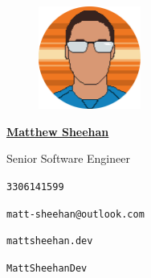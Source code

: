 \documentclass[12pt, oneside, final]{article}
\newlength{\logowidth}  \setlength{\logowidth}{0.75in}
\begin{document}
  \thispagestyle{empty}
  


    \begin{figure}
        \includegraphics[width = 0.3\textwidth]{figures/self-pixel-circle.png}
    \end{figure}


  \underline{\large\textsf{\textbf{Matthew Sheehan}}}

  \textmd{\small{Senior Software Engineer}}

  \vfill

  \vspace*{\fill}
  {\footnotesize{\faPhone}} \small{\texttt{330{\textendash}614{\textendash}1599}}

  \vspace*{\fill}
  {\footnotesize{\faEnvelope}} \small{\texttt{matt-sheehan@outlook.com}}

  \vspace*{\fill}
  {\footnotesize{\faGlobe}} \small{\texttt{mattsheehan.dev}}

  \vspace*{\fill}
  {\footnotesize{\faGithub}} \small{\texttt{MattSheehanDev}}
\end{document}

